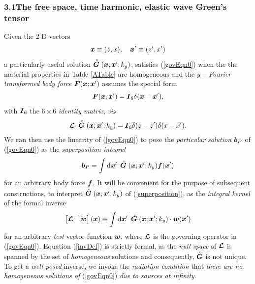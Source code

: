 \documentclass[11pt]{article}
\newcommand{\CB}[1]{\mbox{\boldmath$\cal #1$\unboldmath}}
\newcommand{\bmi}[1]{\mbox{\boldmath$\mit #1$\unboldmath}}
\newcommand{\rf}[1]{\stackrel{\scriptscriptstyle _{\,\,\circ}}{ #1}}
\begin{document}
\subsubsection*{3.1\quad The free space, time harmonic,  elastic wave Green's tensor}
Given the 2-D vectors
\[
{\bmi  x}\equiv (z,x), \quad {\bmi  x}^{\prime}\equiv (z^{\prime},x^{\prime})
\]
a particularly useful solution $\rf{\bmi  G }({\bmi  x};{\bmi  x}^{\prime};k_y)$,
satisfies (\ref{govEqn0}) 	when the the material properties in
Table \ref{ATable} are homogeneous and the  {\em $y-$Fourier transformed body
force\/} ${\bmi F}({\bmi x};{\bmi x}^{\prime})$ assumes the
special form
\[
{\bmi F}({\bmi x};{\bmi x}^{\prime})=
{\bmi  I}_6 \delta({\bmi x}-{\bmi x}^{\prime}),
\]
with ${\bmi  I}_6$ the $6 \times 6$ {\em identity matrix\/}, {\em viz\/}
\begin{equation} \label{GreenDef}
{{\CB L}}\cdot \rf{\bmi  G}({\bmi  x};{\bmi  x}^{\prime};k_y)={\bmi  I}_6
\delta({z}-{z}^{\prime})\delta({x}-{x}^{\prime}).
\end{equation}
We can then use the linearity of (\ref{govEqn0}) to pose the {\em
particular solution\/} ${\bmi  b}_{P}$ of (\ref{govEqn0}) as the {\em
superposition integral\/}
\begin{equation}	\label{superposition}
	{\bmi  b}_{P}=\int {\rm d}{\bmi  x}^{\prime}\, \rf{\bmi  G}({\bmi  x};{\bmi
x}^{\prime};k_y){\bmi
	f}({\bmi  x}^{\prime})
\end{equation}
for an arbitrary body force $\bmi  f$.
It will be  convenient for the purpose of subsequent constructions, to
interpret
$\rf{\bmi  G}({\bmi  x};{\bmi  x}^{\prime};k_y)$  of (\ref{superposition}), as the
{\em integral kernel\/} of the formal inverse
\begin{equation}	\label{invDef}
	\left[{{\CB L}}^{-1} {\bmi  w}\right]({\bmi  x})\equiv \int {\rm d}{\bmi
	x}^{\prime}\, \rf{\bmi  G }({\bmi  x};{\bmi  x}^{\prime};k_y)\cdot{\bmi  w}({\bmi
x}^{\prime})
\end{equation}
for an arbitrary {\em test\/} vector-function $\bmi  w$, where ${{\CB L}}$ is the governing
operator in (\ref{govEqn0}). Equation
(\ref{invDef}) is strictly formal,  as the {\em null space\/} of
${{\CB L}}$ is spanned by the set of {\em homogeneous\/} solutions and
consequently,
$\rf{\bmi  G}$ is not unique. To get a {\em well posed\/} inverse, we invoke
the {\em radiation condition\/} that {\em there are no homogeneous
solutions
of\/} (\ref{govEqn0}) {\em due to sources at infinity\/}.
\end{document}
